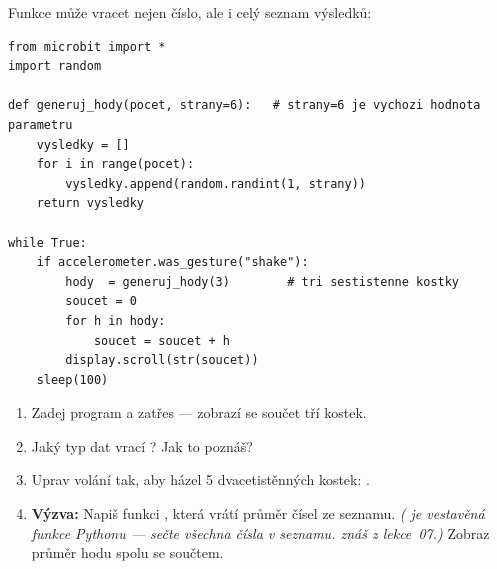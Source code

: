 \begin{bonusukol}

Funkce může vracet nejen číslo, ale i celý seznam výsledků:

\begin{lstlisting}
from microbit import *
import random

def generuj_hody(pocet, strany=6):   # strany=6 je vychozi hodnota parametru
    vysledky = []
    for i in range(pocet):
        vysledky.append(random.randint(1, strany))
    return vysledky

while True:
    if accelerometer.was_gesture("shake"):
        hody  = generuj_hody(3)        # tri sestistenne kostky
        soucet = 0
        for h in hody:
            soucet = soucet + h
        display.scroll(str(soucet))
    sleep(100)
\end{lstlisting}

\begin{enumerate}
  \item Zadej program a zatřes — zobrazí se součet tří kostek.
  \item Jaký typ dat vrací ? Jak to poznáš?
  \item Uprav volání tak, aby házel 5 dvacetistěnných kostek:
        .
  \item \textbf{Výzva:} Napiš funkci , která vrátí
        průměr čísel ze seznamu.
        \textit{( je vestavěná funkce Pythonu — sečte
        všechna čísla v seznamu.  znáš z lekce~07.)}
        Zobraz průměr hodu spolu se součtem.
\end{enumerate}

\odpoved[3cm]

\end{bonusukol}


